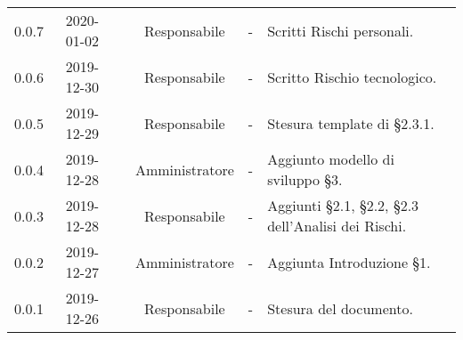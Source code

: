 {\begin{longtable}{ c c  C{2.5cm} c C{2.5cm} C{3.5cm}}
0.0.7 & 2020-01-02 & \SE{} & Responsabile & - & Scritti Rischi personali. \\
0.0.6 & 2019-12-30 & \SE{} & Responsabile & - & Scritto Rischio tecnologico. \\
0.0.5 & 2019-12-29 & \SE{} & Responsabile & - & Stesura template di §2.3.1. \\
0.0.4 & 2019-12-28 & \LD{} & Amministratore & - & Aggiunto modello di sviluppo §3. \\
0.0.3 & 2019-12-28 & \SE{} & Responsabile & - & Aggiunti §2.1, §2.2, §2.3 dell'Analisi dei Rischi. \\
0.0.2 & 2019-12-27 & \LD{} & Amministratore & - & Aggiunta Introduzione §1. \\
0.0.1 & 2019-12-26 & \SE{} & Responsabile & - & Stesura del documento. \\
		
\end{longtable}
}